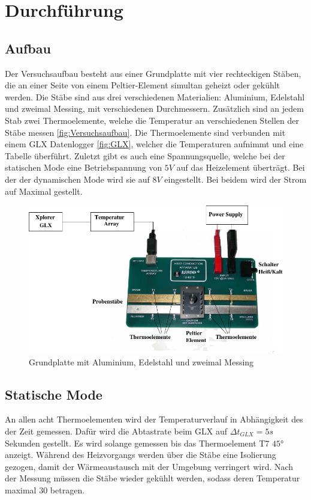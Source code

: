 \section{Durchführung}
\label{sec:Durchführung}

\subsection{Aufbau}
Der Versuchsaufbau besteht aus einer Grundplatte mit vier rechteckigen Stäben, die an einer Seite von einem Peltier-Element simultan geheizt oder gekühlt werden.
Die Stäbe sind aus drei verschiedenen Materialien:  Aluminium, Edelstahl und zweimal Messing, mit verschiedenen Durchmessern.
Zusätzlich sind an jedem Stab zwei Thermoelemente, welche die Temperatur an verschiedenen Stellen der Stäbe messen \autoref{fig:Versuchsaufbau}.
Die Thermoelemente sind verbunden mit einem GLX Datenlogger \autoref{fig:GLX}, welcher die Temperaturen aufnimmt und eine Tabelle überführt.
Zuletzt gibt es auch eine Spannungsquelle, welche bei der statischen Mode eine Betriebspannung von $5\si{V}$ auf das Heizelement überträgt. 
Bei der der dynamischen Mode wird sie auf $8\si{V}$ eingestellt. Bei beidem wird der Strom auf Maximal gestellt.

\begin{figure}[H]
    \centering
    \includegraphics{content/Abb_1.pdf}
    \caption{Grundplatte mit Aluminium, Edelstahl und zweimal Messing\cite[3]{V204}}
    \label{fig:Versuchsaufbau}
\end{figure}

\subsection{Statische Mode}
An allen acht Thermoelementen wird der Temperaturverlauf in Abhängigkeit des der Zeit gemessen.
Dafür wird die Abtastrate beim GLX auf $\Delta t_{GLX} = 5\si{s}$ Sekunden gestellt.
Es wird solange gemessen bis das Thermoelement T7 $45°$ anzeigt.
Während des Heizvorgangs werden über die Stäbe eine Isolierung gezogen, damit der Wärmeaustausch mit der Umgebung verringert wird.
Nach der Messung müssen die Stäbe wieder gekühlt werden, sodass deren Temperatur maximal $30$ betragen.

